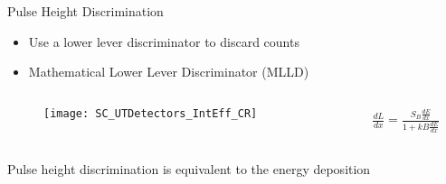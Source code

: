 \begin{frame}[t]{Pulse Height Discrimination}
\label{PHDMain}
  \begin{itemize}
    \item Use a lower lever discriminator to discard counts
    \item Mathematical Lower Lever Discriminator (MLLD)
  \end{itemize}
  \begin{columns}[onlytextwidth]
    \begin{column}{0.7\textwidth}
      \begin{figure}
          \vspace*{-1cm}
          \texttt{[image: SC\_UTDetectors\_IntEff\_CR]}
      \end{figure}
    \end{column}
    \begin{column}{0.25\textwidth}
  \begin{align*}
    \frac{dL}{dx} = \frac{S_B\frac{dE}{dx}}{1+kB\frac{dE}{dx}}
  \end{align*}
    \end{column}
  \end{columns}
  Pulse height discrimination is equivalent to the energy deposition
\hyperlink{MeasMethods}{}
\end{frame}

